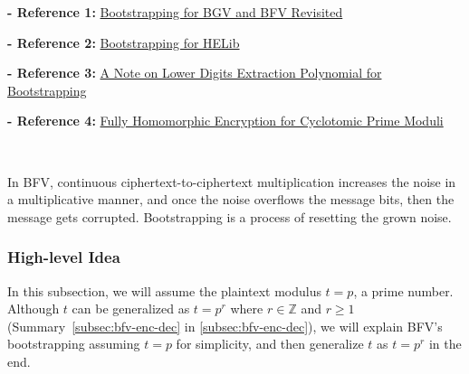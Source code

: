 \noindent \textbf{- Reference 1:} 
\href{https://eprint.iacr.org/2022/1363.pdf}{Bootstrapping for BGV and BFV Revisited}~\cite{cryptoeprint:2022/1363}


\noindent \textbf{- Reference 2:} 
\href{https://eprint.iacr.org/2014/873.pdf}{Bootstrapping for HELib}~\cite{10.1007/s00145-020-09368-7}

\noindent \textbf{- Reference 3:} 
\href{https://arxiv.org/pdf/1906.02867}{A Note on Lower Digits Extraction Polynomial for Bootstrapping}~\cite{huo2019notelowerdigitsextraction}

\noindent \textbf{- Reference 4:} 
\href{https://eprint.iacr.org/2024/1587.pdf}{Fully Homomorphic Encryption for Cyclotomic Prime Moduli}~\cite{cryptoeprint:2024/1587}



$ $

In BFV, continuous ciphertext-to-ciphertext multiplication increases the noise in a multiplicative manner, and once the noise overflows the message bits, then the message gets corrupted. Bootstrapping is a process of resetting the grown noise. 

\subsubsection{High-level Idea}
\label{subsubsec:bfv-bootstrapping-high-level}

In this subsection, we will assume the plaintext modulus $t = p$, a prime number. Although $t$ can be generalized as $t = p^r$ where $r \in \mathbb{Z}$ and $r \geq 1$ (Summary~\ref*{subsec:bfv-enc-dec} in \autoref{subsec:bfv-enc-dec}), we will explain BFV's bootstrapping assuming $t=p$ for simplicity, and then generalize $t$ as $t = p^r$ in the end. 

